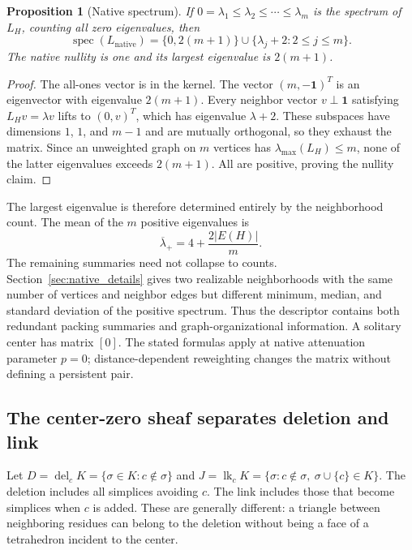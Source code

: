 \documentclass[11pt]{article}
\newtheorem{proposition}{Proposition}
\newcommand{\spec}{\operatorname{spec}}
\newcommand{\del}{\operatorname{del}}
\newcommand{\lk}{\operatorname{lk}}
\begin{document}
\begin{proposition}[Native spectrum]
If $0=\lambda_1\leq\lambda_2\leq\cdots\leq\lambda_m$ is the spectrum of $L_H$, counting all zero eigenvalues, then
\begin{equation}
\spec(L_{\mathrm{native}})=\{0,2(m+1)\}\cup\{\lambda_j+2:2\leq j\leq m\}.
\label{eq:native-spectrum}
\end{equation}
The native nullity is one and its largest eigenvalue is $2(m+1)$.
\label{prop:native}
\end{proposition}
\begin{proof}
The all-ones vector is in the kernel. The vector $(m,-\mathbf1)^T$ is an eigenvector with eigenvalue $2(m+1)$. Every neighbor vector $v\perp\mathbf1$ satisfying $L_Hv=\lambda v$ lifts to $(0,v)^T$, which has eigenvalue $\lambda+2$. These subspaces have dimensions $1$, $1$, and $m-1$ and are mutually orthogonal, so they exhaust the matrix. Since an unweighted graph on $m$ vertices has $\lambda_{\max}(L_H)\leq m$, none of the latter eigenvalues exceeds $2(m+1)$. All are positive, proving the nullity claim.
\end{proof}

The largest eigenvalue is therefore determined entirely by the neighborhood count. The mean of the $m$ positive eigenvalues is
\begin{equation}
\overline\lambda_+=4+\frac{2|E(H)|}{m}.
\label{eq:native-mean}
\end{equation}
The remaining summaries need not collapse to counts. Section~\ref{sec:native_details} gives two realizable neighborhoods with the same number of vertices and neighbor edges but different minimum, median, and standard deviation of the positive spectrum. Thus the descriptor contains both redundant packing summaries and graph-organizational information. A solitary center has matrix $[0]$. The stated formulas apply at native attenuation parameter $p=0$; distance-dependent reweighting changes the matrix without defining a persistent pair.



\subsection{The center-zero sheaf separates deletion and link}
Let $D=\del_cK=\{\sigma\in K:c\notin\sigma\}$ and $J=\lk_cK=\{\sigma:c\notin\sigma,\ \sigma\cup\{c\}\in K\}$. The deletion includes all simplices avoiding $c$. The link includes those that become simplices when $c$ is added. These are generally different: a triangle between neighboring residues can belong to the deletion without being a face of a tetrahedron incident to the center.
\end{document}
